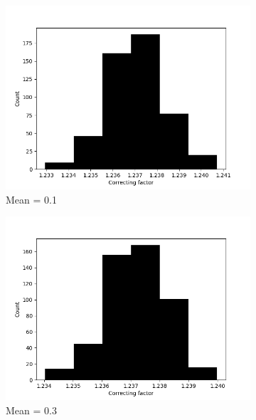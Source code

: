 \begin{figure}[!htbp]
  \begin{subfigure}{0.45\textwidth}
    \centering
    \includegraphics[width=1\textwidth]{./images/robust_approx/correcting_factors_hadamard_mean_10_01.png}
    \caption{Mean = 0.1}
  \end{subfigure}
  \begin{subfigure}{0.45\textwidth}
    \centering
    \includegraphics[width=1\textwidth]{./images/robust_approx/correcting_factors_hadamard_mean_10_03.png}
    \caption{Mean = 0.3}
  \end{subfigure}
  \begin{subfigure}{0.45\textwidth}
    \centering

\end{subfigure}
\end{figure}
